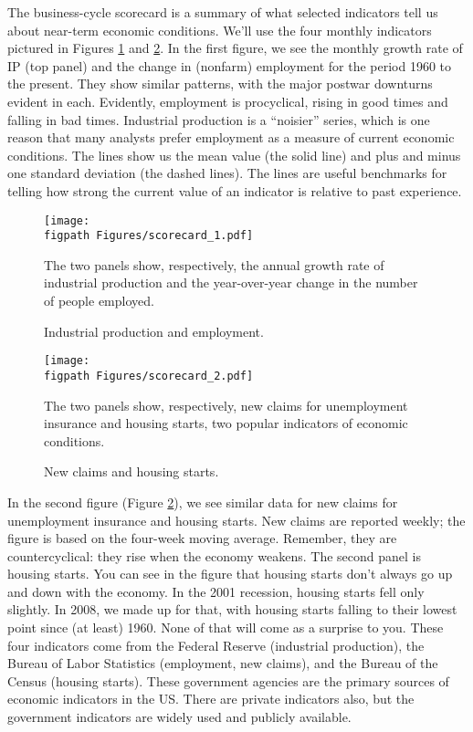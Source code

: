 The business-cycle scorecard 
 is a summary of
what selected indicators tell us about near-term economic conditions.
We'll use the four monthly indicators pictured
in Figures \ref{fig:ip_emp} and \ref{fig:newclaims_hs}.
In the first figure, we see the monthly growth rate
of IP (top panel) and the change in (nonfarm) employment
for the period 1960 to the present.
They show similar patterns, with the major postwar
downturns evident in each.
Evidently, employment is procyclical,  rising in good times
and falling in bad times.
Industrial production is a ``noisier'' series, which is one reason that
many analysts prefer employment as a measure of current economic
conditions. The lines show us the mean value (the solid line)
and plus and minus
one standard deviation (the dashed lines).
The lines are useful benchmarks for telling how strong the
current value of an indicator is relative to past experience.

\begin{figure}[!ht]
     \caption{Industrial production and employment.}
    \label{fig:ip_emp}%
    \centering
    \texttt{[image: \\figpath Figures/scorecard\_1.pdf]}
    \begin{minipage}{0.85\textwidth}
    {\footnotesize The two panels show, respectively,
    the annual growth rate of industrial production and
    the year-over-year change in the number of people employed.}
    \end{minipage}
\end{figure}

\begin{figure}[!ht]
    \caption{New claims and housing starts.}
    \label{fig:newclaims_hs}%
    \centering
    \texttt{[image: \\figpath Figures/scorecard\_2.pdf]}
    \begin{minipage}{0.85\textwidth}
    {\footnotesize The two panels show, respectively,
    new claims for unemployment insurance
    and housing starts, two popular indicators of economic conditions.}
    \end{minipage}
\end{figure}


In the second figure (Figure \ref{fig:newclaims_hs}),
we see similar data for new claims for unemployment insurance
and housing starts.
New claims are reported weekly; the figure is
based on the four-week moving average.
Remember, they are countercyclical:  they rise when the economy weakens.
The second panel is housing starts.
You can see in the figure that housing starts don't always go up
and down with the economy.
In the 2001 recession,
housing starts fell only slightly.
In 2008, we made up for that,
with housing starts falling to their lowest point
since (at least) 1960.
None of that will come as a surprise to you.
These four indicators come from the Federal Reserve (industrial production),
the Bureau of Labor Statistics (employment, new claims),
and the Bureau of the Census (housing starts).
These government agencies are the primary sources of economic indicators
in the US.
There are private indicators also,
but the government indicators are widely used and publicly available.

